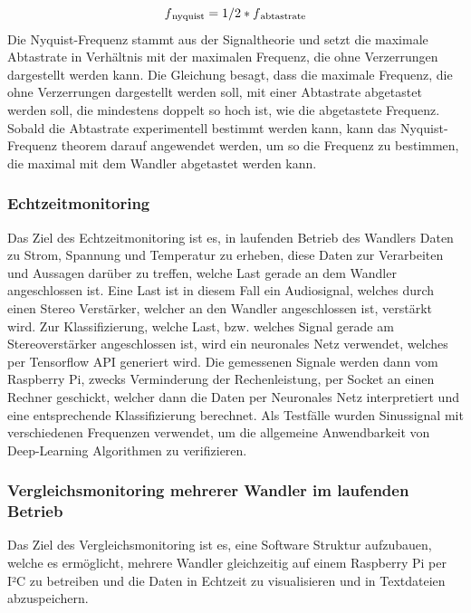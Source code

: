\begin{equation}
\label{Nyquist}
f\textsubscript{nyquist} = 1/2 * f\textsubscript{abtastrate}
\end{equation}
Die Nyquist-Frequenz stammt aus der Signaltheorie und setzt die maximale Abtastrate in Verhältnis mit der maximalen Frequenz, die ohne Verzerrungen dargestellt werden kann. Die Gleichung besagt, dass die maximale Frequenz, die ohne Verzerrungen dargestellt werden soll, mit einer Abtastrate abgetastet werden soll, die mindestens doppelt so hoch ist, wie die abgetastete Frequenz. Sobald die Abtastrate experimentell bestimmt werden kann, kann das Nyquist-Frequenz theorem darauf angewendet werden, um so die Frequenz zu bestimmen, die maximal mit dem Wandler abgetastet werden kann. 



\subsubsection{Echtzeitmonitoring}
Das Ziel des Echtzeitmonitoring ist es, in laufenden Betrieb des Wandlers Daten zu Strom, Spannung und Temperatur zu erheben, diese Daten zur Verarbeiten und Aussagen darüber zu treffen, welche Last gerade an dem Wandler angeschlossen ist. Eine Last ist in diesem Fall ein Audiosignal, welches durch einen Stereo Verstärker, welcher an den Wandler angeschlossen ist, verstärkt wird. 
Zur Klassifizierung, welche Last, bzw. welches Signal gerade am Stereoverstärker angeschlossen ist, wird ein neuronales Netz verwendet, welches per Tensorflow API generiert wird. Die gemessenen Signale werden dann vom Raspberry Pi, zwecks Verminderung der Rechenleistung, per Socket an einen Rechner geschickt, welcher dann die Daten per Neuronales Netz interpretiert und eine entsprechende Klassifizierung berechnet. Als Testfälle wurden Sinussignal mit verschiedenen Frequenzen verwendet, um die allgemeine Anwendbarkeit von Deep-Learning Algorithmen zu verifizieren. 


\subsubsection{Vergleichsmonitoring mehrerer Wandler im laufenden Betrieb}

Das Ziel des Vergleichsmonitoring ist es, eine Software Struktur aufzubauen, welche es ermöglicht, mehrere Wandler gleichzeitig auf einem Raspberry Pi per I²C zu betreiben und die Daten in Echtzeit zu visualisieren und in Textdateien abzuspeichern. 
 
